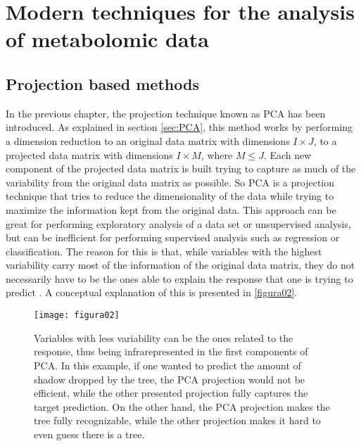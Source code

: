 
\chapter[Modern techniques for the analysis of metabolomic data]{Modern techniques for the analysis of metabolomic data}
\label{chapter:modern_techniques}


\section{Projection based methods}
\label{projectionmethods}
In the previous chapter, the projection technique known as PCA has been introduced. As explained in section \ref{sec:PCA}, this method works by performing a dimension reduction to an original data matrix with dimensions $I \times J$, to a projected data matrix with dimensions $I \times M$, where $M\leq J$. Each new component of the projected data matrix is built trying to capture as much of the variability from the original data matrix as possible. So PCA is a projection technique that tries to reduce the dimensionality of the data while trying to maximize the information kept from the original data. This approach can be great for performing exploratory analysis of a data set or unsupervised analysis, but can be inefficient for performing supervised analysis such as regression or classification. The reason for this is that, while variables with the highest variability carry most of the information of the original data matrix, they do not necessarily have to be the ones able to explain the response that one is trying to predict \parencite{kettaneh2005pca}. A conceptual explanation of this is presented in \autoref{figura02}.

\begin{figure}[htbp]\centering
		\texttt{[image: figura02]}
		\caption[Differences between PCA and PLS]{Variables with less variability can be the ones related to the response, thus being infrarepresented in the first components of PCA. In this example, if one wanted to predict the amount of shadow dropped by the tree, the PCA projection would not be efficient, while the other presented projection fully captures the target prediction. On the other hand, the PCA projection makes the tree fully recognizable, while the other projection makes it hard to even guess there is a tree.}
		\label{figura02}
	\end{figure}

